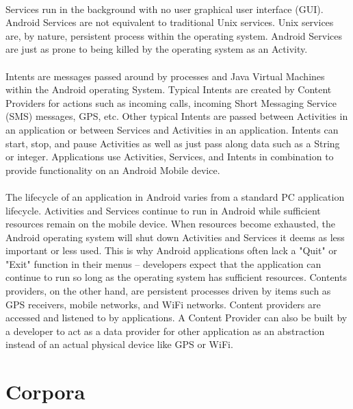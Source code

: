 		\paragraph{}Services run in the background with no user graphical user interface (GUI). Android Services are not equivalent to traditional Unix services.  Unix services are, by nature, persistent process within the operating system.  Android Services are just as prone to being killed by the operating system as an Activity. 
		\paragraph{}Intents are messages passed around by processes and Java Virtual Machines within the Android operating System. Typical Intents are created by Content Providers for actions such as incoming calls, incoming Short Messaging Service (SMS) messages, GPS, etc.  Other typical Intents are passed between Activities in an application or between Services and Activities in an application.  Intents can start, stop, and pause Activities as well as just pass along data such as a String or integer. Applications use Activities, Services, and Intents in combination to provide functionality on an Android Mobile device.  
		\paragraph{} The lifecycle of an application in Android varies from a standard PC application lifecycle. Activities and Services continue to run in Android while sufficient resources remain on the mobile device.  When resources become exhausted, the Android operating system will shut down Activities and Services it deems as less important or less used.  This is why Android applications often lack a "Quit" or "Exit" function in their menus -- developers expect that the application can continue to run so long as the operating system has sufficient resources.  Contents providers, on the other hand, are persistent processes driven by items such as GPS receivers, mobile networks, and WiFi networks.  Content providers are accessed and listened to by applications.  A Content Provider can also be built by a developer to act as a data provider for other application as an abstraction instead of an actual physical device like GPS or WiFi.\cite{murphy_busy_2010}

\section{Corpora}
